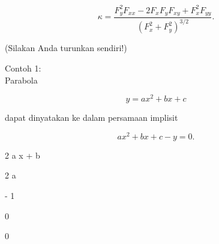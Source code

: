 \documentclass[a4paper,10pt]{article}
\begin{document}
\begin{eulernotebook}
\begin{eulercomment}
\begin{eulercomment}
\begin{eulercomment}
\begin{eulercomment}
\begin{eulercomment}
\begin{eulercomment}
\begin{eulercomment}
\begin{eulercomment}
\begin{eulercomment}
\begin{eulercomment}
\begin{eulercomment}
\begin{eulercomment}
\begin{eulercomment}
\begin{eulercomment}
\begin{eulercomment}
\begin{eulercomment}
\begin{eulercomment}
\begin{eulercomment}
\begin{eulercomment}
\begin{eulercomment}
\begin{eulercomment}
\begin{eulercomment}
\begin{eulercomment}
\end{eulercomment}
\begin{eulerformula}
\[
\kappa =\frac {F_y^2F_{xx}-2F_xF_yF_{xy}+F_x^2F_{yy}}{\left(F_x^2+F_y^2\right)^{3/2}}.
\]
\end{eulerformula}
\begin{eulercomment}
(Silakan Anda turunkan sendiri!)

Contoh 1:\\
Parabola

\end{eulercomment}
\begin{eulerformula}
\[
y=ax^2+bx+c
\]
\end{eulerformula}
\begin{eulercomment}
dapat dinyatakan ke dalam persamaan implisit

\end{eulercomment}
\begin{eulerformula}
\[
ax^2+bx+c-y=0.
\]
\end{eulerformula}
\begin{euleroutput}
  
                                2 a x + b
  
  
                                   2 a
  
  
                                   - 1
  
  
                                    0
  
  
                                    0
  

\end{euleroutput}
\end{eulercomment}
\end{eulercomment}
\end{eulercomment}
\end{eulercomment}
\end{eulercomment}
\end{eulercomment}
\end{eulercomment}
\end{eulercomment}
\end{eulercomment}
\end{eulercomment}
\end{eulercomment}
\end{eulercomment}
\end{eulercomment}
\end{eulercomment}
\end{eulercomment}
\end{eulercomment}
\end{eulercomment}
\end{eulercomment}
\end{eulercomment}
\end{eulercomment}
\end{eulercomment}
\end{eulercomment}
\end{eulernotebook}
\end{document}
